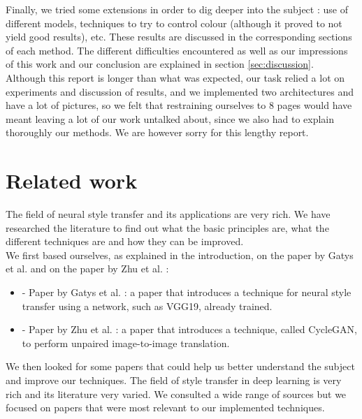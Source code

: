\documentclass[twocolumn,superscriptaddress,aps,floatfix, nofootinbib]{revtex4-1}
\begin{document}
    Finally, we tried some extensions in order to dig deeper into the subject : use of different models, techniques to try to control colour (although it proved to not yield good results), etc. These results are discussed in the corresponding sections of each method. The different difficulties encountered as well as our impressions of this work and our conclusion are explained in section \ref{sec:discussion}.\\
    
    Although this report is longer than what was expected, our task relied a lot on experiments and discussion of results, and we implemented two architectures and have a lot of pictures, so we felt that restraining ourselves to 8 pages would have meant leaving a lot of our work untalked about, since we also had to explain thoroughly our methods. We are however sorry for this lengthy report.
    
    
    
    
    \section{Related work}
    
    The field of neural style transfer and its applications are very rich. We have researched the literature to find out what the basic principles are, what the different techniques are and how they can be improved.\\
    
    We first based ourselves, as explained in the introduction, on the paper by Gatys et al. and on the paper by Zhu et al. :
    
    \begin{itemize}
        \item \cite{DBLP:journals/corr/GatysEB15a} - Paper by Gatys et al. : a paper that introduces a technique for neural style transfer using a network, such as VGG19, already trained.
        \item \cite{DBLP:journals/corr/ZhuPIE17} - Paper by Zhu et al. : a paper that introduces a technique, called CycleGAN, to perform unpaired image-to-image translation.
    \end{itemize}
    
    We then looked for some papers that could help us better understand the subject and improve our techniques. The field of style transfer in deep learning is very rich and its literature very varied. We consulted a wide range of sources but we focused on papers that were most relevant to our implemented techniques.
    
\end{document}
